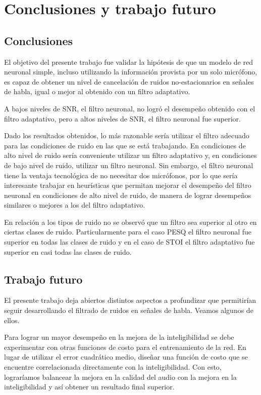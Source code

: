 \section{Conclusiones y trabajo futuro}

\subsection{Conclusiones}

El objetivo del presente trabajo fue validar la hipótesis de que un modelo de red neuronal simple, incluso utilizando la información provista por un solo micrófono, es capaz de obtener un nivel de cancelación de ruidos no-estacionarios en señales de habla, igual o mejor al obtenido con un filtro adaptativo.

A bajos niveles de SNR, el filtro neuronal, no logró el desempeño obtenido con el filtro adaptativo, pero a altos niveles de SNR, el filtro neuronal fue superior.

Dado los resultados obtenidos, lo más razonable sería utilizar el filtro adecuado para las condiciones de ruido en las que se está trabajando. En condiciones de alto nivel de ruido sería conveniente utilizar un filtro adaptativo y, en condiciones de bajo nivel de ruido, utilizar un filtro neuronal. Sin embargo, el filtro neuronal tiene la ventaja tecnológica de no necesitar dos micrófonos, por lo que sería interesante trabajar en heurísticas que permitan mejorar el desempeño del filtro neuronal en condiciones de alto nivel de ruido, de manera de lograr desempeños similares o mejores a los del filtro adaptativo.

En relación a los tipos de ruido no se observó que un filtro sea superior al otro en ciertas clases de ruido. Particularmente para el caso PESQ el filtro neuronal fue superior en todas las clases de ruido y en el caso de STOI el filtro adaptativo fue superior en casi todas las clases de ruido.

\subsection{Trabajo futuro}

El presente trabajo deja abiertos distintos aspectos a profundizar que permitirían seguir desarrollando el filtrado de ruidos en señales de habla. Veamos algunos de ellos.

Para lograr un mayor desempeño en la mejora de la inteligibilidad se debe experimentar con otras funciones de costo para el entrenamiento de la red. En lugar de utilizar el error cuadrático medio, diseñar una función de costo que se encuentre correlacionada directamente con la inteligibilidad. Con esto, lograríamos balancear la mejora en la calidad del audio con la mejora en la inteligibilidad y así obtener un resultado final superior.

